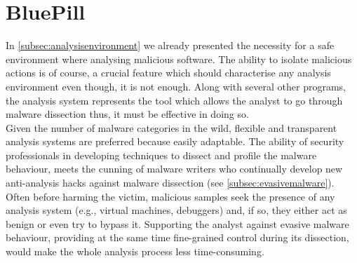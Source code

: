 \documentclass[LaM,binding=0.6cm]{sapthesis}
\begin{document}
\section{BluePill}
\label{sec:bluepill}
In \autoref{subsec:analysisenvironment} we already presented the necessity for a safe environment where analysing malicious software. The ability to isolate malicious actions is of course, a crucial feature which should characterise any analysis environment even though, it is not enough. Along with several other programs, the analysis system represents the tool which allows the analyst to go through malware dissection thus, it must be effective in doing so.\\
Given the number of malware categories in the wild, flexible and transparent analysis systems are preferred because easily adaptable. The ability of security professionals in developing techniques to dissect and profile the malware behaviour, meets the cunning of malware writers who continually develop new anti-analysis hacks against malware dissection (see \autoref{subsec:evasivemalware}). Often before harming the victim, malicious samples seek the presence of any analysis system (e.g., virtual machines, debuggers) and, if so, they either act as benign or even try to bypass it. Supporting the analyst against evasive malware behaviour, providing at the same time fine-grained control during its dissection, would make the whole analysis process less time-consuming.
\end{document}
